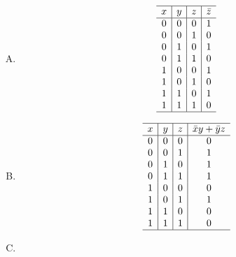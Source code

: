 {{        %
        \begin{practices}
            \begin{enumerate}[A.]
                \item
                {
                    \begin{table}[H]
                        \centering

                        \[
                            \begin{array}{c|c|c|c}
                                \hline
                                x & y & z & \bar{z} \\
                                \hline
                                0 & 0 & 0 & 1 \\
                                0 & 0 & 1 & 0 \\
                                0 & 1 & 0 & 1 \\
                                0 & 1 & 1 & 0 \\
                                1 & 0 & 0 & 1 \\
                                1 & 0 & 1 & 0 \\
                                1 & 1 & 0 & 1 \\
                                1 & 1 & 1 & 0 \\
                                \hline
                            \end{array}
                        \]
                    \end{table}
                }
                \item
                {
                    \begin{table}[H]
                        \centering

                        \[
                            \begin{array}{c|c|c|c}
                                \hline
                                x & y & z & \bar{x}y + \bar{y}z \\
                                \hline
                                0 & 0 & 0 & 0 \\
                                0 & 0 & 1 & 1 \\
                                0 & 1 & 0 & 1 \\
                                0 & 1 & 1 & 1 \\
                                1 & 0 & 0 & 0 \\
                                1 & 0 & 1 & 1 \\
                                1 & 1 & 0 & 0 \\
                                1 & 1 & 1 & 0 \\
                                \hline
                            \end{array}
                        \]
                    \end{table}
                }
                \item
                {
                    \begin{table}[H]
                        \centering


\end{table}}
\end{enumerate}
\end{practices}}}

